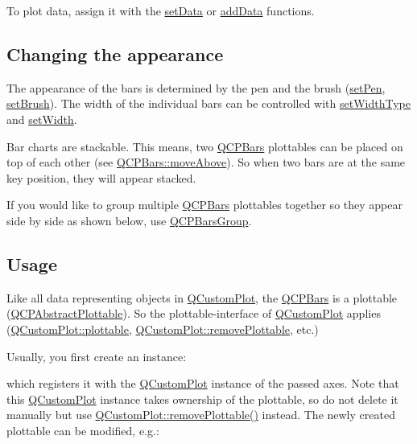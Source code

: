 To plot data, assign it with the \mbox{\hyperlink{class_q_c_p_bars_a6dc562ec7120a8521e1061f2134367e4}{set\+Data}} or \mbox{\hyperlink{class_q_c_p_bars_a323d6970d6d6e3166d89916a7f60f733}{add\+Data}} functions.\hypertarget{class_q_c_p_bars_qcpbars-appearance}{}\subsection{Changing the appearance}\label{class_q_c_p_bars_qcpbars-appearance}
The appearance of the bars is determined by the pen and the brush (\mbox{\hyperlink{class_q_c_p_abstract_plottable_ab74b09ae4c0e7e13142fe4b5bf46cac7}{set\+Pen}}, \mbox{\hyperlink{class_q_c_p_abstract_plottable_a7a4b92144dca6453a1f0f210e27edc74}{set\+Brush}}). The width of the individual bars can be controlled with \mbox{\hyperlink{class_q_c_p_bars_adcaa3b41281bb2c0f7949b341592fcc0}{set\+Width\+Type}} and \mbox{\hyperlink{class_q_c_p_bars_afec6116579d44d5b706e0fa5e5332507}{set\+Width}}.

Bar charts are stackable. This means, two \mbox{\hyperlink{class_q_c_p_bars}{Q\+C\+P\+Bars}} plottables can be placed on top of each other (see \mbox{\hyperlink{class_q_c_p_bars_ac22e00a6a41509538c21b04f0a57318c}{Q\+C\+P\+Bars\+::move\+Above}}). So when two bars are at the same key position, they will appear stacked.

If you would like to group multiple \mbox{\hyperlink{class_q_c_p_bars}{Q\+C\+P\+Bars}} plottables together so they appear side by side as shown below, use \mbox{\hyperlink{class_q_c_p_bars_group}{Q\+C\+P\+Bars\+Group}}.

\hypertarget{class_q_c_p_bars_qcpbars-usage}{}\subsection{Usage}\label{class_q_c_p_bars_qcpbars-usage}
Like all data representing objects in \mbox{\hyperlink{class_q_custom_plot}{Q\+Custom\+Plot}}, the \mbox{\hyperlink{class_q_c_p_bars}{Q\+C\+P\+Bars}} is a plottable (\mbox{\hyperlink{class_q_c_p_abstract_plottable}{Q\+C\+P\+Abstract\+Plottable}}). So the plottable-\/interface of \mbox{\hyperlink{class_q_custom_plot}{Q\+Custom\+Plot}} applies (\mbox{\hyperlink{class_q_custom_plot_a32de81ff53e263e785b83b52ecd99d6f}{Q\+Custom\+Plot\+::plottable}}, \mbox{\hyperlink{class_q_custom_plot_af3dafd56884208474f311d6226513ab2}{Q\+Custom\+Plot\+::remove\+Plottable}}, etc.)

Usually, you first create an instance\+: 
\begin{DoxyCodeInclude}{0}
\end{DoxyCodeInclude}
which registers it with the \mbox{\hyperlink{class_q_custom_plot}{Q\+Custom\+Plot}} instance of the passed axes. Note that this \mbox{\hyperlink{class_q_custom_plot}{Q\+Custom\+Plot}} instance takes ownership of the plottable, so do not delete it manually but use \mbox{\hyperlink{class_q_custom_plot_af3dafd56884208474f311d6226513ab2}{Q\+Custom\+Plot\+::remove\+Plottable()}} instead. The newly created plottable can be modified, e.\+g.\+: 
\begin{DoxyCodeInclude}{0}
\end{DoxyCodeInclude}


